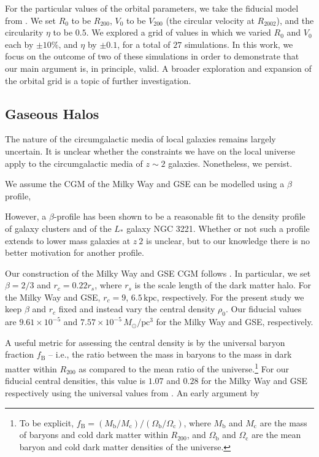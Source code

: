 \documentclass[linenumbers, twocolumn]{aastex631}
\newcommand{\Msun}{\ensuremath{M_{\odot}}}
\newcommand{\pc}{\ensuremath{\textrm{pc}}}
\begin{document}
For the particular values of the orbital parameters, we take the fiducial model from \citet{2021ApJ...923...92N}. We set $R_0$ to be $R_{200}$, $V_0$ to be $V_{200}$ (the circular velocity at $R_{2002}$), and the circularity $\eta$ to be $0.5$. We explored a grid of values in which we varied $R_0$ and $V_0$ each by $\pm10\%$, and $\eta$ by $\pm0.1$, for a total of $27$ simulations. In this work, we focus on the outcome of two of these simulations in order to demonstrate that our main argument is, in principle, valid. A broader exploration and expansion of the orbital grid is a topic of further investigation.

\subsection{Gaseous Halos}\label{ssec:gashalo}

The nature of the circumgalactic media of local galaxies remains largely
uncertain. It is unclear whether the constraints we have on the local universe
apply to the circumgalactic media of $z\sim2$ galaxies. Nonetheless, we persist.

We assume the CGM of the Milky Way and GSE can be modelled using a $\beta$ profile,

However, a $\beta$-profile has been shown to be a reasonable fit to the density
profile of galaxy clusters and of the $L_{*}$ galaxy NGC 3221. Whether or not
such a profile extends to lower mass galaxies at $z~2$ is unclear, but to our
knowledge there is no better motivation for another profile.

Our construction of the Milky Way and GSE CGM follows
\citet{2023MNRAS.tmp.2070B}. In particular, we set $\beta=2/3$ and $r_c=0.22
r_s$, where $r_s$ is the scale length of the dark matter halo. For the Milky Way
and GSE, $r_c=9$, $6.5\,\textrm{kpc}$, respectively. For the present study we
keep $\beta$ and $r_c$ fixed and instead vary the central density $\rho_0$. Our
fiducial values are $9.61\times10^{-5}$ and $7.57\times10^{-5}\,\Msun/\pc^3$ for
the Milky Way and GSE, respectively.

A useful metric for assessing the central density is by the universal baryon
fraction $f_{\textrm{B}}$ -- i.e., the ratio between the mass in baryons to the
mass in dark matter within $R_{200}$ as compared to the mean ratio of the
universe.\footnote{To be explicit,
$f_{\textrm{B}}=(M_{\textrm{b}}/M_{\textrm{c}})/(\Omega_{\textrm{b}}/\Omega_{\textrm{c}})$,
where $M_{\textrm{b}}$ and $M_{\textrm{c}}$ are the mass of baryons and cold
dark matter within $R_{200}$, and $\Omega_{\textrm{b}}$ and
$\Omega_{\textrm{c}}$ are the mean baryon and cold dark matter densities of the
universe.} For our fiducial central densities, this value is $1.07$ and $0.28$
for the Milky Way and GSE respectively using the universal values from
\cite{2014AA...571A..16P}. An early argument by 
\end{document}
